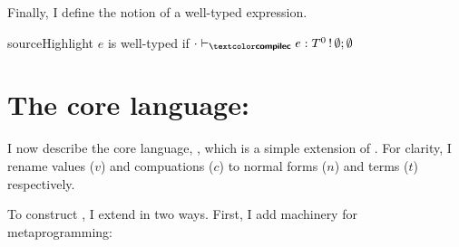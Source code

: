 Finally, I define the notion of a well-typed \sourceLang{} expression. 
\begin{definition}{sourceHighlight}
  $e$ is well-typed if $\ctypejudge[\cdot]{e}{T^0 \, ! \, \emptyset;\emptyset}$
\end{definition}

\section{The core language: \texorpdfstring{\coreLang{}}{Lambda-Op-AST}}\label{section:core-lang}
I now describe the core language, \coreLang{}, which is a simple extension of \efflang{}. For clarity, I rename \efflang{} values ($v$) and compuations ($c$) to \coreLang{} normal forms ($n$) and terms ($t$) respectively.  

To construct \coreLang{}, I extend \efflang{} in two ways. First, I add machinery for metaprogramming:

